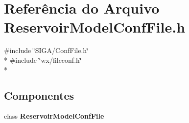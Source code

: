 \section{Referência do Arquivo Reservoir\+Model\+Conf\+File.\+h}
\label{_reservoir_model_conf_file_8h}
{\ttfamily \#include \char`\"{}S\+I\+G\+A/\+Conf\+File.\+h\char`\"{}}\\*
{\ttfamily \#include \char`\"{}wx/fileconf.\+h\char`\"{}}\\*
\subsection*{Componentes}
\begin{DoxyCompactItemize}
\item 
class {\bf Reservoir\+Model\+Conf\+File}
\end{DoxyCompactItemize}
